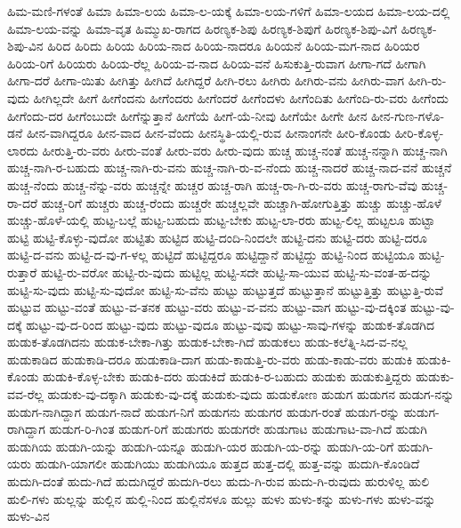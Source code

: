 {ಹಿಮ-ಮಣಿ-ಗಳಂತೆ
ಹಿಮಾ
ಹಿಮಾ-ಲಯ
ಹಿಮಾ-ಲ-ಯಕ್ಕೆ
ಹಿಮಾ-ಲಯ-ಗಳಿಗೆ
ಹಿಮಾ-ಲಯದ
ಹಿಮಾ-ಲಯ-ದಲ್ಲಿ
ಹಿಮಾ-ಲಯ-ವನ್ನು
ಹಿಮಾ-ವೃತ
ಹಿಮ್ಮುಖ-ರಾಗದ
ಹಿರಣ್ಯಕ-ಶಿಪು
ಹಿರಣ್ಯಕ-ಶಿಪುಗೆ
ಹಿರಣ್ಯಕ-ಶಿಪು-ವಿಗೆ
ಹಿರಣ್ಯಕ-ಶಿಪು-ವಿನ
ಹಿರಿದ
ಹಿರಿದು
ಹಿರಿಯ
ಹಿರಿಯ-ನಾದ
ಹಿರಿಯ-ನಾದರೂ
ಹಿರಿಯನೆ
ಹಿರಿಯ-ಮಗ-ನಾದ
ಹಿರಿಯರ
ಹಿರಿಯ-ರಿಗೆ
ಹಿರಿಯರು
ಹಿರಿಯ-ರೆಲ್ಲ
ಹಿರಿಯ-ವ-ನಾದ
ಹಿರಿಯ-ವನೆ
ಹಿಸುಕುತ್ತಿ-ರುವಾಗ
ಹೀಗಾ-ಗದೆ
ಹೀಗಾಗಿ
ಹೀಗಾ-ದರೆ
ಹೀಗಾ-ಯಿತು
ಹೀಗಿತ್ತು
ಹೀಗಿದೆ
ಹೀಗಿದ್ದರೆ
ಹೀಗಿ-ರಲು
ಹೀಗಿರು
ಹೀಗಿರು-ವನು
ಹೀಗಿರು-ವಾಗ
ಹೀಗಿ-ರು-ವುದು
ಹೀಗಿಲ್ಲದೇ
ಹೀಗೆ
ಹೀಗೆಂದನು
ಹೀಗೆಂದರು
ಹೀಗೆಂದರೆ
ಹೀಗೆಂದಳು
ಹೀಗೆಂದಿತು
ಹೀಗೆಂದಿ-ರು-ವರು
ಹೀಗೆಂದು
ಹೀಗೆಂದು-ದರ
ಹೀಗೆಂಬುದೇ
ಹೀಗೆನ್ನುತ್ತಾನೆ
ಹೀಗೆಯೆ
ಹೀಗೆ-ಯೆ-ನೀವು
ಹೀಗೆಯೇ
ಹೀಗೇ
ಹೀನ
ಹೀನ-ಗುಣ-ಗಳೊ-ಡನೆ
ಹೀನ-ವಾಗಿದ್ದರೂ
ಹೀನ-ವಾದ
ಹೀನ-ವೆಂದು
ಹೀನಸ್ಥಿತಿ-ಯಲ್ಲಿ-ರುವ
ಹೀನಾಂಗನೇ
ಹೀರಿ-ಕೊಂಡು
ಹೀರಿ-ಕೊಳ್ಳ-ಲಾರದು
ಹೀರುತ್ತಿ-ರು-ವರು
ಹೀರು-ವಂತೆ
ಹೀರು-ವರು
ಹೀರು-ವುದು
ಹುಚ್ಚ
ಹುಚ್ಚ-ನಂತೆ
ಹುಚ್ಚ-ನನ್ನಾಗಿ
ಹುಚ್ಚ-ನಾಗಿ
ಹುಚ್ಚ-ನಾಗಿ-ರ-ಬಹುದು
ಹುಚ್ಚ-ನಾಗಿ-ರು-ವನು
ಹುಚ್ಚ-ನಾಗಿ-ರು-ವ-ನೆಂದು
ಹುಚ್ಚ-ನಾದರೆ
ಹುಚ್ಚ-ನಾದ-ವನೆ
ಹುಚ್ಚನೆ
ಹುಚ್ಚ-ನೆಂದು
ಹುಚ್ಚ-ನೆನ್ನು-ವರು
ಹುಚ್ಚನ್ನೇ
ಹುಚ್ಚರ
ಹುಚ್ಚ-ರಾಗಿ
ಹುಚ್ಚ-ರಾ-ಗಿ-ರು-ವರು
ಹುಚ್ಚ-ರಾಗು-ವೆವು
ಹುಚ್ಚ-ರಾ-ದರೆ
ಹುಚ್ಚ-ರಿಗೆ
ಹುಚ್ಚರು
ಹುಚ್ಚ-ರೆಂದು
ಹುಚ್ಚರೇ
ಹುಚ್ಚಲ್ಲವೇ
ಹುಚ್ಚಾಗಿ-ಹೋಗುತ್ತಿತ್ತು
ಹುಚ್ಚು
ಹುಚ್ಚು-ಹೊಳೆ
ಹುಚ್ಚು-ಹೊಳೆ-ಯಲ್ಲಿ
ಹುಟ್ಟ-ಬಲ್ಲೆ
ಹುಟ್ಟ-ಬಹುದು
ಹುಟ್ಟ-ಬೇಕು
ಹುಟ್ಟ-ಲಾ-ರರು
ಹುಟ್ಟ-ಲಿಲ್ಲ
ಹುಟ್ಟಲೂ
ಹುಟ್ಟಾ
ಹುಟ್ಟಿ
ಹುಟ್ಟಿ-ಕೊಳ್ಳು-ವುದೋ
ಹುಟ್ಟಿತು
ಹುಟ್ಟಿದ
ಹುಟ್ಟಿ-ದಂದಿ-ನಿಂದಲೇ
ಹುಟ್ಟಿ-ದನು
ಹುಟ್ಟಿ-ದರು
ಹುಟ್ಟಿ-ದರೂ
ಹುಟ್ಟಿ-ದ-ವನು
ಹುಟ್ಟಿ-ದ-ವು-ಗ-ಳಲ್ಲ
ಹುಟ್ಟಿದೆ
ಹುಟ್ಟಿದ್ದರೂ
ಹುಟ್ಟಿದ್ದಾನೆ
ಹುಟ್ಟಿದ್ದು
ಹುಟ್ಟಿ-ನಿಂದ
ಹುಟ್ಟಿಯೂ
ಹುಟ್ಟಿ-ರುತ್ತಾರೆ
ಹುಟ್ಟಿ-ರು-ವರೋ
ಹುಟ್ಟಿ-ರು-ವುದು
ಹುಟ್ಟಿಲ್ಲ
ಹುಟ್ಟಿ-ಸದೇ
ಹುಟ್ಟಿ-ಸಾ-ಯುವ
ಹುಟ್ಟಿ-ಸು-ವಂತ-ಹ-ದನ್ನು
ಹುಟ್ಟಿ-ಸು-ವುದು
ಹುಟ್ಟಿ-ಸು-ವುದೋ
ಹುಟ್ಟಿ-ಸು-ವೆನು
ಹುಟ್ಟು
ಹುಟ್ಟುತ್ತದೆ
ಹುಟ್ಟುತ್ತಾನೆ
ಹುಟ್ಟುತ್ತಿತ್ತು
ಹುಟ್ಟುತ್ತಿ-ರುವೆ
ಹುಟ್ಟುವ
ಹುಟ್ಟು-ವಂತೆ
ಹುಟ್ಟು-ವ-ತನಕ
ಹುಟ್ಟು-ವರು
ಹುಟ್ಟು-ವ-ವನು
ಹುಟ್ಟು-ವಾಗ
ಹುಟ್ಟು-ವು-ದಕ್ಕಿಂತ
ಹುಟ್ಟು-ವು-ದಕ್ಕೆ
ಹುಟ್ಟು-ವು-ದ-ರಿಂದ
ಹುಟ್ಟು-ವುದು
ಹುಟ್ಟು-ವುದೂ
ಹುಟ್ಟು-ವುವು
ಹುಟ್ಟು-ಸಾವು-ಗಳನ್ನು
ಹುಡುಕ-ತೊಡಗಿದ
ಹುಡುಕ-ತೊಡಗಿದನು
ಹುಡುಕ-ಬೇಕಾ-ಗಿತ್ತು
ಹುಡುಕ-ಬೇಕಾ-ಗಿದೆ
ಹುಡುಕಲು
ಹುಡು-ಕಲೆತ್ನಿ-ಸಿದ-ವ-ನಲ್ಲ
ಹುಡುಕಾಡಿದ
ಹುಡುಕಾಡಿ-ದರೂ
ಹುಡುಕಾಡಿ-ದಾಗ
ಹುಡು-ಕಾಡುತ್ತಿ-ರು-ವರು
ಹುಡು-ಕಾಡು-ವರು
ಹುಡುಕಿ
ಹುಡುಕಿ-ಕೊಂಡು
ಹುಡುಕಿ-ಕೊಳ್ಳ-ಬೇಕು
ಹುಡುಕಿ-ದರು
ಹುಡುಕಿದೆ
ಹುಡುಕಿ-ರ-ಬಹುದು
ಹುಡುಕು
ಹುಡುಕುತ್ತಿದ್ದರು
ಹುಡುಕು-ವವ-ರೆಲ್ಲ
ಹುಡುಕು-ವು-ದಕ್ಕಾಗಿ
ಹುಡುಕು-ವು-ದಕ್ಕೆ
ಹುಡುಕು-ವುದು
ಹುಡುಕೋಣ
ಹುಡುಗ
ಹುಡುಗನ
ಹುಡುಗ-ನನ್ನು
ಹುಡುಗ-ನಾಗಿದ್ದಾಗ
ಹುಡುಗ-ನಾದೆ
ಹುಡುಗ-ನಿಗೆ
ಹುಡುಗನು
ಹುಡುಗರ
ಹುಡುಗ-ರಂತೆ
ಹುಡುಗ-ರನ್ನು
ಹುಡುಗ-ರಾಗಿದ್ದಾಗ
ಹುಡುಗ-ರಿ-ಗಿಂತ
ಹುಡುಗ-ರಿಗೆ
ಹುಡುಗರು
ಹುಡುಗರೇ
ಹುಡುಗಾಟ
ಹುಡುಗಾಟ-ವಾ-ಗಿದೆ
ಹುಡುಗಿ
ಹುಡುಗಿಯ
ಹುಡುಗಿ-ಯನ್ನು
ಹುಡುಗಿ-ಯನ್ನೂ
ಹುಡುಗಿ-ಯರ
ಹುಡುಗಿ-ಯ-ರನ್ನು
ಹುಡುಗಿ-ಯ-ರಿಗೆ
ಹುಡುಗಿ-ಯರು
ಹುಡುಗಿ-ಯಾಗಲೀ
ಹುಡುಗಿಯು
ಹುಡುಗಿಯೂ
ಹುತ್ತದ
ಹುತ್ತ-ದಲ್ಲಿ
ಹುತ್ತ-ವನ್ನು
ಹುದುಗಿ-ಕೊಂಡಿದೆ
ಹುದುಗಿ-ದಂತೆ
ಹುದು-ಗಿದೆ
ಹುದುಗಿದ್ದರೆ
ಹುದುಗಿ-ರಲು
ಹುದು-ಗಿ-ರುವ
ಹುದು-ಗಿ-ರುವುದು
ಹುರುಳಿಲ್ಲ
ಹುಲಿ
ಹುಲಿ-ಗಳು
ಹುಲ್ಲನ್ನು
ಹುಲ್ಲಿನ
ಹುಲ್ಲಿ-ನಿಂದ
ಹುಲ್ಲಿನೆಸಳೂ
ಹುಲ್ಲು
ಹುಳು
ಹುಳು-ಕನ್ನು
ಹುಳು-ಗಳು
ಹುಳು-ವನ್ನು
ಹುಳು-ವಿನ
}
